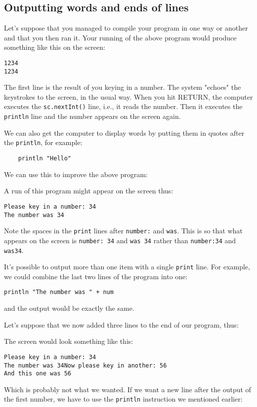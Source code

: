 \subsection{Outputting words and ends of lines}

Let's suppose that you managed to compile your program in one way or
another and that you then ran it.  Your running of the above program
would produce something like this on the screen:
\begin{Verbatim}
1234
1234
\end{Verbatim}
The first line is the result of you keying in a number.  The system "echoes"
the keystrokes to the screen, in the usual way.  When you hit RETURN, the
computer executes the \verb!sc.nextInt()! line, i.e., it reads the number.  Then it
executes the \verb!println! line and the number appears on the screen again.

We can also get the computer to display words by putting them in quotes
after the \verb!println!, for example:
\begin{Verbatim}
	println "Hello"
\end{Verbatim}
We can use this to improve the above program:


A run of this program might appear on the screen thus:
\begin{Verbatim}
Please key in a number: 34
The number was 34
\end{Verbatim}
Note the spaces in the \verb!print! lines after \verb!number:! and \verb!was!.
This is so that what appears on the screen is \verb!number: 34! and
\verb!was 34! rather than \verb!number:34! and \verb!was34!.

It's possible to output more than one item with a single \verb!print! line.
For example, we could combine the last two lines of the program into one:
\begin{Verbatim}
println "The number was " + num
\end{Verbatim}
and the output would be exactly the same.

Let's suppose that we now added three lines to the end of our program, thus:


The screen would look something like this:
\begin{Verbatim}
Please key in a number: 34
The number was 34Now please key in another: 56
And this one was 56
\end{Verbatim}
Which is probably not what we wanted.  If we want a new line after the
output of the first number, we have to use the \verb!println! instruction we mentioned earlier:

